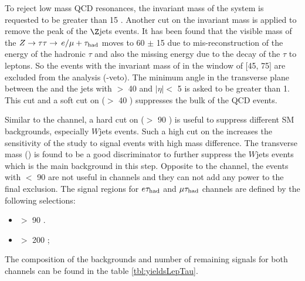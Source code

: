 To reject low mass QCD resonances, the invariant mass of the \leptonTau system  is requested to be greater than 15 \GeV. 
Another cut on the invariant mass is applied to remove the peak of the $\Z$jets events. 
It has been found that the visible mass of the $Z\to\tau\tau\to\,e/\mu +\tau_{\rm had}$ moves to 60 $\pm$ 15 \GeV due to 
mis-reconstruction of the energy of the hadronic $\tau$ and also the missing energy due to the decay of the $\tau$ to leptons. 
So the events with the invariant mass of \leptonTau in the window of [45, 75] are excluded from the analysis (\Z-veto). 
The minimum angle in the transverse plane between the \MET and the jets with \PT $>$ 40 \GeV and $|\eta| <$ 5 
is asked to be greater than 1. This cut and a soft cut on \mttwo ($>$ 40 \GeV) suppresses the bulk of the QCD events.

Similar to the \tauTau channel, a hard cut on \mttwo ($>$ 90 \GeV) is useful to suppress different SM backgrounds, especially $W$jets events.
Such a high cut on the \mttwo increases the sensitivity of the study to signal events with high mass difference. The \Tau transverse mass (\tauMT)
is found to be a good discriminator to further suppress the $W$jets events which is the main background in this step. 
Opposite to the \tauTau channel, the events with \mttwo $<$ 90 \GeV are not useful in \leptonTau channels and they can not add any power to 
the final exclusion. The signal regions for $e\tau_{\rm had}$ and $\mu\tau_{\rm had}$ channels are defined by the following selections:
\begin{itemize}
\item \mttwo $>$ 90 \GeV.
\item \tauMT $>$ 200 \GeV; 
\end{itemize}

 The composition of the backgrounds and number of remaining signals for both channels can be found in the table \ref{tbl:yieldsLepTau}.

